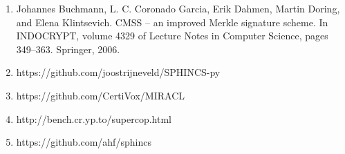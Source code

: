 \documentclass[]{scrartcl}
\begin{document}
\begin{enumerate}
	\item Johannes Buchmann, L. C. Coronado Garcia, Erik Dahmen, Martin Doring, and Elena Klintsevich. CMSS -- an improved Merkle signature scheme. In INDOCRYPT, volume 4329 of Lecture Notes in Computer Science, pages 349--363. Springer, 2006.
	\item https://github.com/joostrijneveld/SPHINCS-py
	\item https://github.com/CertiVox/MIRACL
	\item http://bench.cr.yp.to/supercop.html
	\item https://github.com/ahf/sphincs
\end{enumerate}
\end{document}
